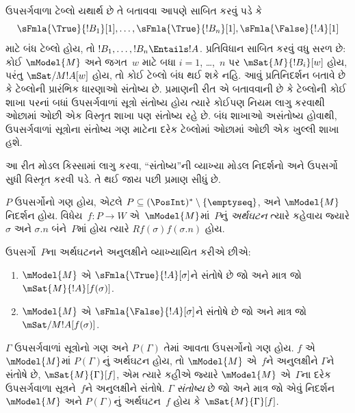 \begin{explain}
  ઉપસર્ગવાળા ટેબ્લો યથાર્થ છે તે બતાવવા આપણે સાબિત કરવું પડે કે
  \[
  \sFmla{\True}{!B_1}[1], \dots, \sFmla{\True}{!B_n}[1], \sFmla{\False}{!A}[1]
  \]
  માટે બંધ ટેબ્લો હોય, તો $!B_1, \dots, !B_n \Entails !A$.
  પ્રતિવિધાન સાબિત કરવું વધુ સરળ છે: કોઈ $\mModel{M}$ અને
  જગત~$w$ માટે બધા $i=1$, \dots,~$n$ પર
  $\mSat{M}{!B_i}[w]$ હોય, પરંતુ
  $\mSat/{M}{!A}[w]$ હોય, તો કોઈ ટેબ્લો બંધ થઈ શકે નહિ.
  આવું પ્રતિનિદર્શન બતાવે છે કે ટેબ્લોની પ્રારંભિક ધારણાઓ
  સંતોષ્ય છે. પ્રમાણની રીત એ બતાવવાની છે કે ટેબ્લોની કોઈ
  શાખા પરનાં બધાં ઉપસર્ગવાળાં સૂત્રો સંતોષ્ય હોય ત્યારે
  કોઈપણ નિયમ લાગુ કરવાથી ઓછામાં ઓછી એક વિસ્તૃત શાખા પણ
  સંતોષ્ય રહે છે. બંધ શાખાઓ અસંતોષ્ય હોવાથી, ઉપસર્ગવાળાં
  સૂત્રોના સંતોષ્ય ગણ માટેના દરેક ટેબ્લોમાં
  ઓછામાં ઓછી એક ખુલ્લી શાખા હશે.

  આ રીત મોડલ કિસ્સામાં લાગુ કરવા, ``સંતોષ્ય''ની વ્યાખ્યા
  મોડલ નિદર્શનો અને ઉપસર્ગો સુધી વિસ્તૃત કરવી પડે. તે થઈ જાય
  પછી પ્રમાણ સીધું છે.
\end{explain}

\begin{defn}
  $P$ ઉપસર્ગોનો ગણ હોય, એટલે $P \subseteq (\PosInt)^*
  \setminus \{\emptyseq\}$, અને $\mModel{M}$ નિદર્શન હોય.
  વિધેય~$f\colon P \to W$ એ~$\mModel{M}$માં~$P$નું
  \emph{અર્થઘટન} ત્યારે કહેવાય જ્યારે $\sigma$ અને $\sigma.n$
  બંને~$P$માં હોય ત્યારે $Rf(\sigma)f(\sigma.n)$ હોય.

  ઉપસર્ગો~$P$ના અર્થઘટનને અનુલક્ષીને વ્યાખ્યાયિત કરીએ છીએ:
  \begin{enumerate}
  \item $\mModel{M}$ એ $\sFmla{\True}{!A}[\sigma]$ને સંતોષે છે
    જો અને માત્ર જો
    $\mSat{M}{!A}[f(\sigma)]$.
  \item $\mModel{M}$ એ $\sFmla{\False}{!A}[\sigma]$ને સંતોષે છે
    જો અને માત્ર જો
    $\mSat/{M}{!A}[f(\sigma)]$.
  \end{enumerate}
\end{defn}

\begin{defn}
  $\Gamma$ ઉપસર્ગવાળાં સૂત્રોનો ગણ અને $P(\Gamma)$ તેમાં
  આવતા ઉપસર્ગોનો ગણ હોય. $f$ એ~$\mModel{M}$માં
  $P(\Gamma)$નું અર્થઘટન હોય, તો $\mModel{M}$ એ~$f$ને અનુલક્ષીને
  $\Gamma$ને સંતોષે છે, $\mSat{M}{\Gamma}[f]$, એમ ત્યારે કહીએ
  જ્યારે $\mModel{M}$ એ~$\Gamma$ના દરેક ઉપસર્ગવાળા
  સૂત્રને~$f$ને અનુલક્ષીને સંતોષે. $\Gamma$
  \emph{સંતોષ્ય} છે જો અને માત્ર જો એવું નિદર્શન~$\mModel{M}$
  અને $P(\Gamma)$નું અર્થઘટન~$f$ હોય કે
  $\mSat{M}{\Gamma}[f]$.
\end{defn}


